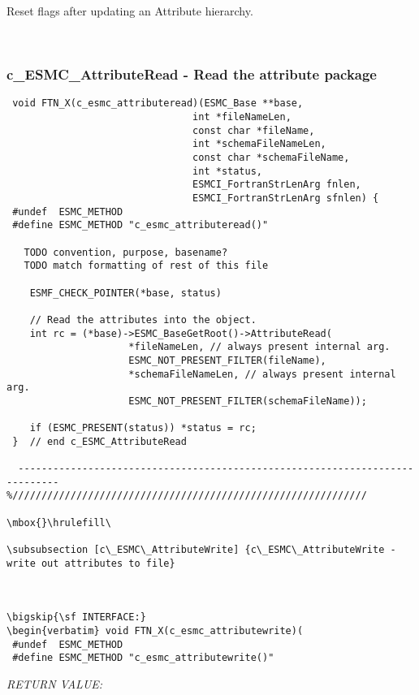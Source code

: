        Reset flags after updating an Attribute hierarchy.
   
 
\mbox{}\hrulefill\ 
 
\subsubsection [c\_ESMC\_AttributeRead] {c\_ESMC\_AttributeRead - Read the attribute package}


  
\begin{verbatim} void FTN_X(c_esmc_attributeread)(ESMC_Base **base,
                                int *fileNameLen,
                                const char *fileName,
                                int *schemaFileNameLen,
                                const char *schemaFileName,
                                int *status,
                                ESMCI_FortranStrLenArg fnlen,
                                ESMCI_FortranStrLenArg sfnlen) {
 #undef  ESMC_METHOD
 #define ESMC_METHOD "c_esmc_attributeread()"
 
   TODO convention, purpose, basename?
   TODO match formatting of rest of this file
 
    ESMF_CHECK_POINTER(*base, status)
 
    // Read the attributes into the object.
    int rc = (*base)->ESMC_BaseGetRoot()->AttributeRead(
                     *fileNameLen, // always present internal arg.
                     ESMC_NOT_PRESENT_FILTER(fileName),
                     *schemaFileNameLen, // always present internal arg.
                     ESMC_NOT_PRESENT_FILTER(schemaFileName));
                     
    if (ESMC_PRESENT(status)) *status = rc;
 }  // end c_ESMC_AttributeRead
 
  ----------------------------------------------------------------------------- 
%/////////////////////////////////////////////////////////////
 
\mbox{}\hrulefill\ 
 
\subsubsection [c\_ESMC\_AttributeWrite] {c\_ESMC\_AttributeWrite - write out attributes to file}


  
\bigskip{\sf INTERFACE:}
\begin{verbatim} void FTN_X(c_esmc_attributewrite)(
 #undef  ESMC_METHOD
 #define ESMC_METHOD "c_esmc_attributewrite()"\end{verbatim}{\em RETURN VALUE:}
